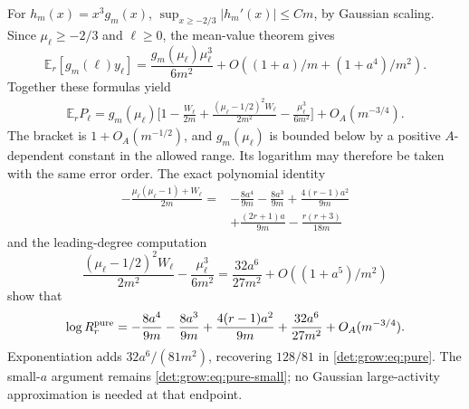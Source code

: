 \documentclass[11pt,letterpaper]{article}
\numberwithin{equation}{section}
\theoremstyle{definition}\newtheorem{definition}[theorem]{Definition}
\theoremstyle{remark}\newtheorem{remark}[theorem]{Remark}
\newcommand{\E}{\mathbb E}
\begin{document}
For $h_m(x)=x^3g_m(x)$,
$\sup_{x\ge-2/3}|h_m'(x)|\le Cm$, by Gaussian scaling.
Since $\mu_\ell\ge-2/3$ and $\ell\ge0$, the mean-value theorem gives
\begin{equation}\label{det:grow:eq:yaverage}
 \E_r[g_m(\ell)y_\ell]
 =\frac{g_m(\mu_\ell)\mu_\ell^3}{6m^2}
 +O\left((1+a)/m+(1+a^4)/m^2\right).
\end{equation}
Together these formulas yield
\begin{equation}\label{det:grow:eq:secondroute}
\begin{aligned}
 \E_rP_\ell=g_m(\mu_\ell)\bigg[1-\frac{W_\ell}{2m}
 +\frac{(\mu_\ell-1/2)^2W_\ell}{2m^2}
 -\frac{\mu_\ell^3}{6m^2}\bigg]+O_A(m^{-3/4}).
\end{aligned}
\end{equation}
The bracket is $1+O_A(m^{-1/2})$, and $g_m(\mu_\ell)$ is bounded below
by a positive $A$-dependent constant in the allowed range. Its
logarithm may therefore be taken with the same error order.
The exact polynomial identity
\begin{equation}\label{det:grow:eq:poly1}
\begin{aligned}
 -\frac{\mu_\ell(\mu_\ell-1)+W_\ell}{2m}
 ={}&-\frac{8a^4}{9m}-\frac{8a^3}{9m}
 +\frac{4(r-1)a^2}{9m}\\
 &+\frac{(2r+1)a}{9m}-\frac{r(r+3)}{18m}
\end{aligned}
\end{equation}
and the leading-degree computation
\begin{equation}\label{det:grow:eq:poly2}
 \frac{(\mu_\ell-1/2)^2W_\ell}{2m^2}
 -\frac{\mu_\ell^3}{6m^2}
 =\frac{32a^6}{27m^2}+O((1+a^5)/m^2)
\end{equation}
show that
\begin{equation}\label{det:grow:eq:purelog}
 \log R_r^{\rm pure}
 =-\frac{8a^4}{9m}-\frac{8a^3}{9m}
 +\frac{4(r-1)a^2}{9m}+\frac{32a^6}{27m^2}+O_A(m^{-3/4}).
\end{equation}
Exponentiation adds $32a^6/(81m^2)$, recovering $128/81$ in
\eqref{det:grow:eq:pure}. The small-$a$ argument remains
\eqref{det:grow:eq:pure-small}; no Gaussian large-activity approximation is
needed at that endpoint.
\end{document}
